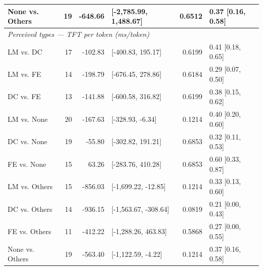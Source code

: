 \begin{table}[ht]
\begin{tabular}{lrrlrl}
None vs. Others & 19 & -648.66 & [-2,785.99, 1,488.67] & 0.6512 & 0.37 [0.16, 0.58] \\
\midrule
\multicolumn{6}{l}{\textit{Perceived types --- TFT per token (ms/token)}} \\
LM vs. DC & 17 & -102.83 & [-400.83, 195.17] & 0.6199 & 0.41 [0.18, 0.65] \\
LM vs. FE & 14 & -198.79 & [-676.45, 278.86] & 0.6184 & 0.29 [0.07, 0.50] \\
DC vs. FE & 13 & -141.88 & [-600.58, 316.82] & 0.6199 & 0.38 [0.15, 0.62] \\
LM vs. None & 20 & -167.63 & [-328.93, -6.34] & 0.1214 & 0.40 [0.20, 0.60] \\
DC vs. None & 19 & -55.80 & [-302.82, 191.21] & 0.6853 & 0.32 [0.11, 0.53] \\
FE vs. None & 15 & 63.26 & [-283.76, 410.28] & 0.6853 & 0.60 [0.33, 0.87] \\
LM vs. Others & 15 & -856.03 & [-1,699.22, -12.85] & 0.1214 & 0.33 [0.13, 0.60] \\
DC vs. Others & 14 & -936.15 & [-1,563.67, -308.64] & 0.0819 & 0.21 [0.00, 0.43] \\
FE vs. Others & 11 & -412.22 & [-1,288.26, 463.83] & 0.5868 & 0.27 [0.00, 0.55] \\
None vs. Others & 19 & -563.40 & [-1,122.59, -4.22] & 0.1214 & 0.37 [0.16, 0.58] \\
\bottomrule
\end{tabular}
\end{table}
